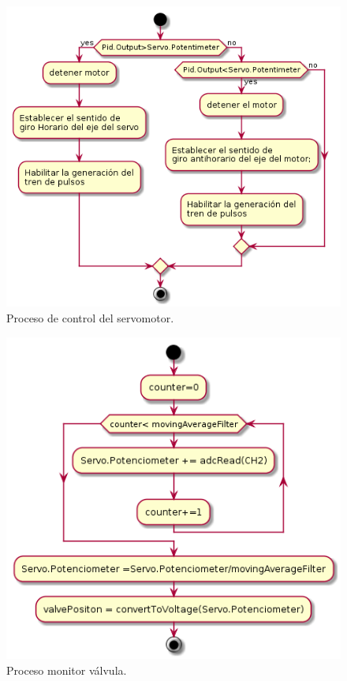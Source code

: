 \begin{figure}[htpb]
	\centering
	\includegraphics[scale=.65]{./Figures/ProcesoControlServo.png}
	\caption{Proceso de control del servomotor.}
	\label{fig:Control servomotor}
	\end{figure}

 	\begin{figure}[htpb]
	\centering
	\includegraphics[scale=.65]{./Figures/MonitorValvula.png}
	\caption{Proceso monitor válvula.}
	\label{fig:Proceso monitor valvula}
	\end{figure}

